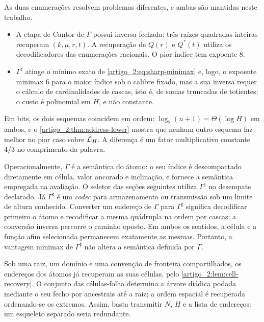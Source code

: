 \begin{remark}\label{map:artigo_2:3.8}\label{artigo_2:rem:which-address}
As duas enumerações resolvem problemas diferentes, e ambas são mantidas neste trabalho.
\begin{itemize}[leftmargin=1.6em]
 \item A etapa de Cantor de $\Gamma$ possui inversa fechada: três raízes quadradas inteiras recuperam $(k,\mu,r,t)$. A recuperação de $Q(r)$ e $Q^*(t)$ utiliza os decodificadores das enumerações racionais. O pior índice tem expoente $8$.
 \item $\Gamma^\sharp$ atinge o mínimo exato de \eqref{artigo_2:eq:sharp-minimax} e, logo, o expoente minimax $6$ para o maior índice sob o calibre fixado, mas a sua inversa requer o cálculo de cardinalidades de cascas, isto é, de somas truncadas de totientes; o custo é polinomial em $H$, e não constante.
\end{itemize}
Em bits, os dois esquemas coincidem em ordem: $\log_2(n+1)=\Theta(\log H)$ em ambos, e o \cref{artigo_2:thm:address-lower} mostra que nenhum outro esquema faz melhor no pior caso sobre $\mathcal{L}_H$. A diferença é um fator multiplicativo constante $4/3$ no comprimento da palavra.
\end{remark}

Operacionalmente, $\Gamma$ é a semântica do átomo: o seu índice é descompactado
diretamente em célula, valor ancorado e inclinação, e fornece a semântica empregada na avaliação. O seletor das seções seguintes utiliza $\Gamma^\sharp$ no desempate declarado. Já $\Gamma^\sharp$ é um
\emph{codec} para armazenamento ou transmissão sob um limite de altura
conhecido. Converter um endereço de $\Gamma$ para $\Gamma^\sharp$ significa
decodificar primeiro o átomo e recodificar a mesma quádrupla na ordem por
cascas; a conversão inversa percorre o caminho oposto. Em ambos os sentidos, a
célula e a função afim selecionada permanecem exatamente as mesmas. Portanto,
a vantagem minimax de $\Gamma^\sharp$ não altera a semântica definida por
$\Gamma$.

Sob uma raiz, um domínio e uma convenção de fronteira compartilhados, os
endereços dos átomos já recuperam as suas células, pelo
\cref{artigo_2:lem:cell-recovery}. O conjunto das células-folha determina a árvore
diádica podada mediante o seu fecho por ancestrais até a raiz; a ordem espacial é
recuperada ordenando-se os extremos. Assim, basta transmitir $N$, $H$ e a lista
de endereços: um esqueleto separado seria redundante.

